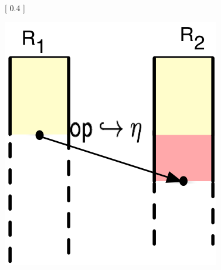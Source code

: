 \begin{figure}
\centering
{} [
  0.4\columnwidth
] {
  \includegraphics[scale=0.7]{Figures/ec-theirs}
 
}
\end{figure}
